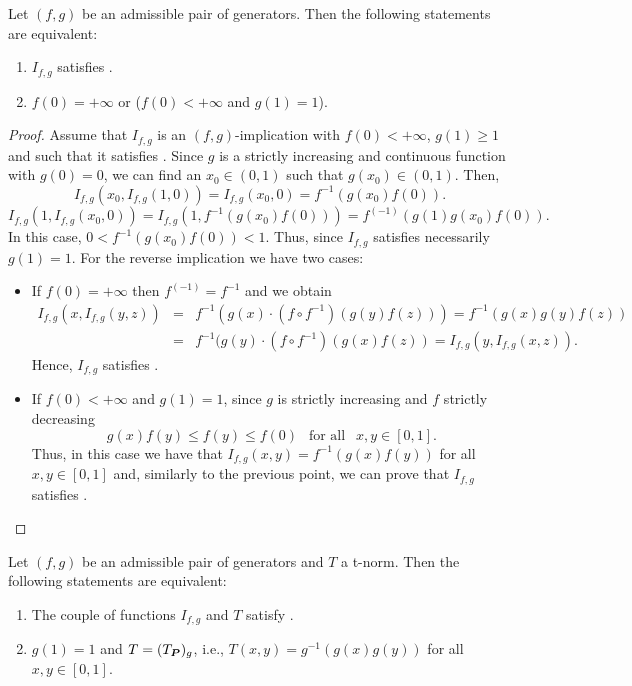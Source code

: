 \begin{proposition}\label{EPfg} 
	Let $(f,g)$ be an admissible pair of generators. Then the following statements are equivalent:
	\begin{enumerate}[label=(\roman*)]
		\item $I_{f,g}$ satisfies \EP.
		\item $f(0)=+\infty$ or ($f(0)<+\infty$ and $g(1)=1$).
	\end{enumerate}
\end{proposition}
\begin{proof}
	Assume that $I_{f,g}$ is an $(f,g)$-implication with $f(0)<+\infty$, $g(1) \geq 1$ and such that it satisfies \EP. Since $g$ is a strictly increasing and continuous function with $g(0)=0$, we can find an $x_0 \in (0,1)$ such that $g(x_0) \in (0,1)$. Then,
	$$I_{f,g}(x_0,I_{f,g}(1,0)) = I_{f,g}(x_0,0)=f^{-1}(g(x_0)f(0)).$$
    $$I_{f,g}(1,I_{f,g}(x_0,0)) = I_{f,g}(1,f^{-1}(g(x_0)f(0)))=f^{(-1)}(g(1)g(x_0)f(0)).$$
    In this case, $0 < f^{-1}(g(x_0)f(0)) < 1$. Thus, since $I_{f,g}$ satisfies \EP necessarily $g(1)=1$. For the reverse implication we have two cases:
	\begin{itemize}
		\item If $f(0)=+ \infty$ then $f^{(-1)}=f^{-1}$ and we obtain
		\begin{eqnarray*}
			I_{f,g}(x,I_{f,g}(y,z))&=& f^{-1}(g(x) \cdot (f \circ f^{-1})(g(y)f(z))) = f^{-1}(g(x)g(y)f(z)) \\
			&=& f^{-1} ( g(y) \cdot (f\circ f^{-1}) (g(x)f(z))= I_{f,g}(y,I_{f,g}(x,z)).
		\end{eqnarray*}
		Hence, $I_{f,g}$ satisfies \EP.
		
		\item If $f(0)< + \infty$ and $g(1)=1$, since $g$ is strictly increasing and $f$ strictly decreasing 
		$$ g(x)f(y) \leq f(y) \leq f(0) ~~ \text{ for all } ~~ x,y \in [0,1].$$
		Thus, in this case we have that $I_{f,g}(x,y)=f^{-1}(g(x)f(y))$ for all $x,y \in [0,1]$ and, similarly to the previous point, we can prove that $I_{f,g}$ satisfies \EP. \qedhere
		
	\end{itemize}
\end{proof}

\begin{proposition}\label{prop:(f,g):(LI)} 
	Let $(f,g)$ be an admissible pair of generators and $T$ a t-norm. Then the following statements are equivalent:
	\begin{enumerate}[label=(\roman*)]
		\item The couple of functions $I_{f,g}$ and $T$ satisfy \LI.
		\item $g(1)=1$ and $T=(T_{\bm{P}})_g$, i.e., $T(x,y)=g^{-1}(g(x)g(y))$ for all $x,y \in [0,1]$.
	\end{enumerate}
\end{proposition}

